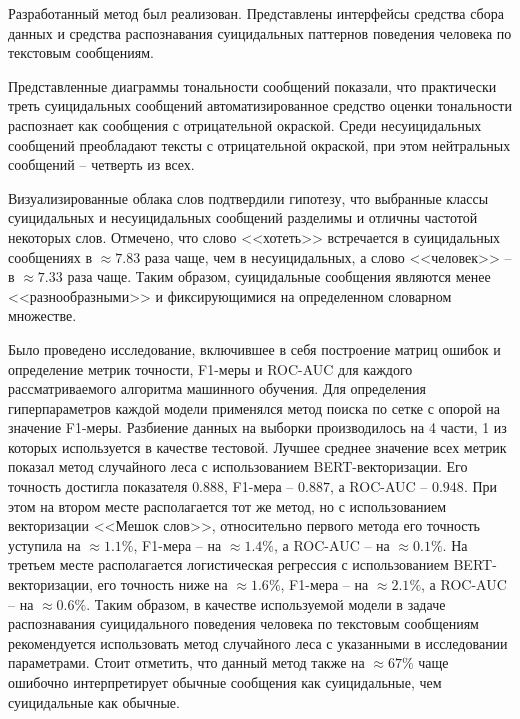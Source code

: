 Разработанный метод был реализован. Представлены интерфейсы средства сбора данных и средства распознавания суицидальных паттернов поведения человека по текстовым сообщениям.

Представленные диаграммы тональности сообщений показали, что практически треть суицидальных сообщений автоматизированное средство оценки тональности распознает как сообщения с отрицательной окраской. 
Среди несуицидальных сообщений преобладают тексты с отрицательной окраской, при этом нейтральных сообщений -- четверть из всех.

Визуализированные облака слов подтвердили гипотезу, что выбранные классы суицидальных и несуицидальных сообщений разделимы и отличны частотой некоторых слов. 
Отмечено, что слово <<хотеть>> встречается в суицидальных сообщениях в $\approx 7.83$ раза чаще, чем в несуицидальных, а слово <<человек>> -- в $\approx 7.33$ раза чаще. 
Таким образом, суицидальные сообщения являются менее <<разнообразными>> и фиксирующимися на определенном словарном множестве.

Было проведено исследование, включившее в себя построение матриц ошибок и определение метрик точности, F1-меры и ROC-AUC для каждого рассматриваемого алгоритма машинного обучения.
Для определения гиперпараметров каждой модели применялся метод поиска по сетке с опорой на значение F1-меры. Разбиение данных на выборки производилось на 4 части, 1 из которых используется в качестве тестовой.
Лучшее среднее значение всех метрик показал метод случайного леса с использованием BERT-векторизации.
Его точность достигла показателя $0.888$, F1-мера -- $0.887$, а ROC-AUC -- $0.948$.
При этом на втором месте располагается тот же метод, но с использованием векторизации <<Мешок слов>>, относительно первого метода его точность уступила на $\approx 1.1\%$, F1-мера -- на $\approx 1.4\%$, а ROC-AUC -- на $\approx 0.1\%$. 
На третьем месте располагается логистическая регрессия с использованием BERT-векторизации, его точность ниже на $\approx 1.6\%$, F1-мера -- на $\approx 2.1\%$, а ROC-AUC -- на $\approx 0.6\%$. 
Таким образом, в качестве используемой модели в задаче распознавания суицидального поведения человека по текстовым сообщениям рекомендуется использовать метод случайного леса с указанными в исследовании параметрами.
Стоит отметить, что данный метод также на $\approx 67\%$ чаще ошибочно интерпретирует обычные сообщения как суицидальные, чем суицидальные как обычные. 

\pagebreak